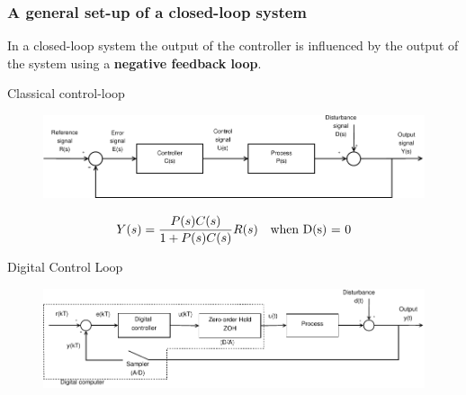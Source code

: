 \begin{frame}
	\frametitle{A general set-up of a closed-loop system}
	\begin{definition}
		In a closed-loop system the output of the controller is influenced by the output of the system using a \textbf{negative feedback loop}.
	\end{definition}
	\begin{block}{Classical control-loop}
		\begin{figure}
			\centering
			\includegraphics[width=0.9\linewidth]{Closed-Loop}
			\label{fig:Closed-Loop}
		\end{figure}
		\vspace{1em}
		\[ Y(s) =  \frac{P(s)C(s)}{1 + P(s)C(s)}R(s) \text{\quad when D(s) = 0}\]
	\end{block}
\end{frame}


\begin{frame}
	\begin{block}{Digital Control Loop}
		\begin{figure}
			\centering
			\includegraphics[width=1\linewidth]{digital-control-system}
			\label{fig:digital-control-system}
		\end{figure}
	\end{block}
\end{frame}

